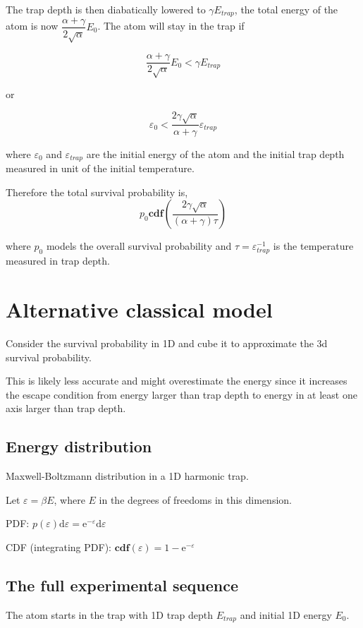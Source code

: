 \documentclass[10pt,fleqn]{article}
\newcommand{\ud}{\mathrm{d}}
\newcommand{\ue}{\mathrm{e}}
\begin{document}
The trap depth is then diabatically lowered to $\gamma E_{trap}$, the total energy
of the atom is now $\dfrac{\alpha + \gamma}{2\sqrt{\alpha}}E_0$. The atom will
stay in the trap if

$$\frac{\alpha + \gamma}{2\sqrt{\alpha}}E_0 < \gamma E_{trap}$$

or

$$\varepsilon_0 < \frac{2\gamma\sqrt{\alpha}}{\alpha + \gamma}\varepsilon_{trap}$$

where $\varepsilon_0$ and $\varepsilon_{trap}$ are the initial energy of the atom
and the initial trap depth measured in unit of the initial temperature.

Therefore the total survival probability is,
$$p_0 \mathbf{cdf}\left(\frac{2\gamma\sqrt{\alpha}}{(\alpha + \gamma) \tau}\right)$$

where $p_0$ models the overall survival probability and
$\tau = \varepsilon_{trap}^{-1}$ is the temperature measured in trap depth.

\section{Alternative classical model}

Consider the survival probability in 1D and cube it to approximate the 3d survival
probability.

This is likely less accurate and might overestimate the energy since it
increases the escape condition from energy larger than trap depth to
energy in at least one axis larger than trap depth.

\subsection{Energy distribution}

Maxwell-Boltzmann distribution in a 1D harmonic trap.

Let $\varepsilon = \beta E$, where $E$ in the degrees of freedoms
in this dimension.

PDF: $p(\varepsilon)\ud\varepsilon = \ue^{-\varepsilon}\ud\varepsilon$

CDF (integrating PDF): $\mathbf{cdf}(\varepsilon) = 1 - \ue^{-\varepsilon}$

\subsection{The full experimental sequence}

The atom starts in the trap with 1D trap depth $E_{trap}$
and initial 1D energy $E_0$.
\end{document}
